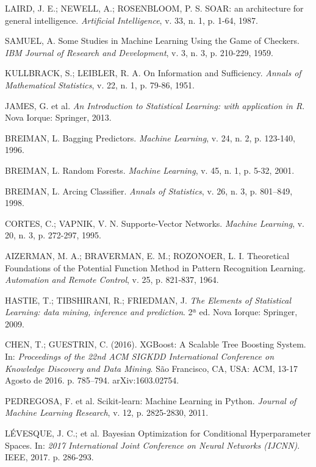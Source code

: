 \documentclass[twocolumn]{rbef}
\newcommand{\1}{\mathbbm{1}}
\begin{document}
\begin{thebibliography}{99}
 LAIRD, J. E.; NEWELL, A.; ROSENBLOOM, P. S. SOAR: an architecture for general intelligence. \textit{Artificial Intelligence}, v. 33, n. 1, p. 1-64, 1987.

 SAMUEL, A. Some Studies in Machine Learning Using the Game of Checkers. \textit{IBM Journal of Research and Development}, v. 3, n. 3, p. 210-229, 1959.

 KULLBRACK, S.; LEIBLER, R. A. On Information and Sufficiency. \textit{Annals of Mathematical Statistics}, v. 22, n. 1, p. 79-86, 1951.

 JAMES, G. et al. \textit{An Introduction to Statistical Learning: with application in R}. Nova Iorque: Springer, 2013.

 BREIMAN, L. Bagging Predictors. \textit{Machine Learning}, v. 24, n. 2, p. 123-140, 1996.

 BREIMAN, L. Random Forests. \textit{Machine Learning}, v. 45, n. 1, p. 5-32, 2001.

 BREIMAN, L. Arcing Classifier. \textit{Annals of Statistics}, v. 26, n. 3, p. 801–849, 1998.

 CORTES, C.; VAPNIK, V. N. Supporte-Vector Networks. \textit{Machine Learning}, v. 20, n. 3, p. 272-297, 1995.

 AIZERMAN, M. A.; BRAVERMAN, E. M.; ROZONOER, L. I. Theoretical Foundations of the Potential Function Method in Pattern Recognition Learning. \textit{Automation and Remote Control}, v. 25, p. 821-837, 1964.

 HASTIE, T.; TIBSHIRANI, R.; FRIEDMAN, J. \textit{The Elements of Statistical Learning: data mining, inference and prediction}. 2ª ed. Nova Iorque: Springer, 2009.

 CHEN, T.; GUESTRIN, C. (2016). XGBoost: A Scalable Tree Boosting System. In: \textit{Proceedings of the 22nd ACM SIGKDD International Conference on Knowledge Discovery and Data Mining}. São Francisco, CA, USA: ACM, 13-17 Agosto de 2016. p. 785–794. arXiv:1603.02754.

 PEDREGOSA, F. et al. Scikit-learn: Machine Learning in Python. \textit{Journal of Machine Learning Research}, v. 12, p. 2825-2830, 2011.

 LÉVESQUE, J. C.; et al. Bayesian Optimization for Conditional Hyperparameter Spaces. In: \textit{2017 International Joint Conference on Neural Networks (IJCNN)}. IEEE, 2017. p. 286-293.

\end{thebibliography}
\end{document}
